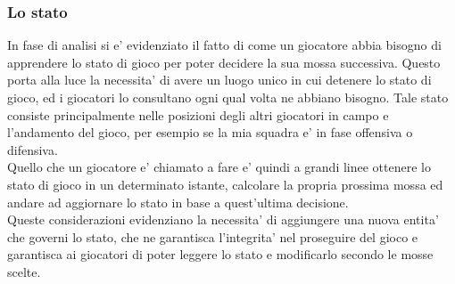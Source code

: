 %

\subsubsection{Lo stato}
\label{sec:entita_coinvolte_stato}

In fase di analisi si e' evidenziato il fatto di come un giocatore abbia bisogno di apprendere lo stato di gioco per poter decidere la sua mossa successiva. Questo porta alla luce la necessita' di avere un luogo unico in cui detenere lo stato di gioco, ed i giocatori lo consultano ogni qual volta ne abbiano bisogno. Tale stato consiste principalmente nelle posizioni degli altri giocatori in campo e l'andamento del gioco, per esempio se la mia squadra e' in fase offensiva o difensiva.\\

Quello che un giocatore e' chiamato a fare e' quindi a grandi linee ottenere lo stato di gioco in un determinato istante, calcolare la propria prossima mossa ed andare ad aggiornare lo stato in base a quest'ultima decisione.\\

Queste considerazioni evidenziano la necessita' di aggiungere una nuova entita' che governi lo stato, che ne garantisca l'integrita' nel proseguire del gioco e garantisca ai giocatori di poter leggere lo stato e modificarlo secondo le mosse scelte.
